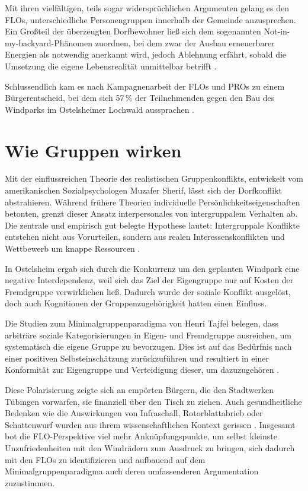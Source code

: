 \documentclass[12pt,a4paper]{article}
\begin{document}
Mit ihren vielfältigen, teils sogar widersprüchlichen Argumenten gelang es den
FLOs, unterschiedliche Personengruppen innerhalb der Gemeinde anzusprechen. Ein
Großteil der überzeugten Dorfbewohner ließ sich dem sogenannten
Not-in-my-backyard-Phänomen zuordnen, bei dem zwar der Ausbau erneuerbarer
Energien als notwendig anerkannt wird, jedoch Ablehnung erfährt, sobald die
Umsetzung die eigene Lebensrealität unmittelbar betrifft \cite{cambridge2025}.

Schlussendlich kam es nach Kampagnenarbeit der FLOs und PROs zu einem
Bürgerentscheid, bei dem sich 57\,\% der Teilnehmenden gegen den Bau des
Windparks im Ostelsheimer Lochwald aussprachen \cite{ostelsheim2025}.

\section{Wie Gruppen wirken}

Mit der einflussreichen Theorie des realistischen Gruppenkonflikts, entwickelt
vom amerikanischen Sozialpsychologen Muzafer Sherif, lässt sich der
Dorfkonflikt abstrahieren. Während frühere Theorien individuelle
Persönlichkeitseigenschaften betonten, grenzt dieser Ansatz interpersonales von
intergruppalem Verhalten ab. Die zentrale und empirisch gut belegte Hypothese
lautet: Intergruppale Konflikte entstehen nicht aus Vorurteilen, sondern aus
realen Interessenskonflikten und Wettbewerb um knappe Ressourcen
\cite{jackson1993}.

In Ostelsheim ergab sich durch die Konkurrenz um den geplanten Windpark eine
negative Interdependenz, weil sich das Ziel der Eigengruppe nur auf Kosten der
Fremdgruppe verwirklichen ließ. Dadurch wurde der soziale Konflikt ausgelöst,
doch auch Kognitionen der Gruppenzugehörigkeit hatten einen Einfluss.

Die Studien zum Minimalgruppenparadigma von Henri Tajfel belegen, dass
arbiträre soziale Kategorisierungen in Eigen- und Fremdgruppe ausreichen, um
systematisch die eigene Gruppe zu bevorzugen. Dies ist auf das Bedürfnis nach
einer positiven Selbsteinschätzung zurückzuführen und resultiert in einer
Konformität zur Eigengruppe und Verteidigung dieser, um dazuzugehören
\cite{tajfel2004}.

Diese Polarisierung zeigte sich an empörten Bürgern, die den Stadtwerken
Tübingen vorwarfen, sie finanziell über den Tisch zu ziehen. Auch
gesundheitliche Bedenken wie die Auswirkungen von Infraschall, Rotorblattabrieb
oder Schattenwurf wurden aus ihrem wissenschaftlichen Kontext gerissen
\cite{biermayer2025}. Insgesamt bot die FLO-Perspektive viel mehr
Anknüpfungspunkte, um selbst kleinste Unzufriedenheiten mit den Windrädern zum
Ausdruck zu bringen, sich dadurch mit den FLOs zu identifizieren und aufbauend
auf dem Minimalgruppenparadigma auch deren umfassenderen Argumentation
zuzustimmen.
\end{document}
